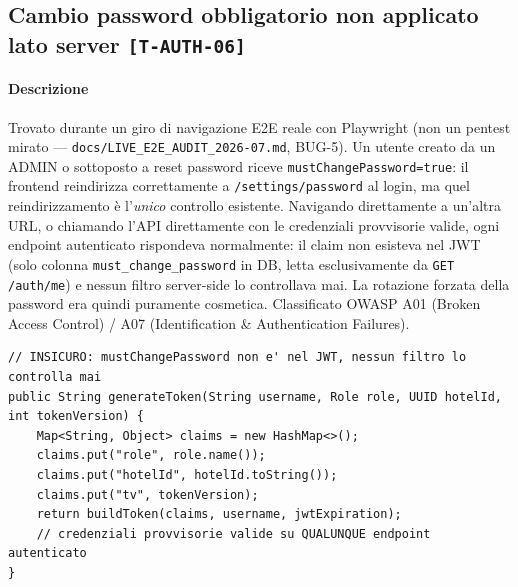 ﻿\documentclass[a4paper,12pt]{report}
\newcommand{\threat}[1]{\texttt{\small\textcolor{vulnred}{[#1]}}}
\begin{document}
\subsection{Cambio password obbligatorio non applicato lato server \threat{T-AUTH-06}}

\paragraph{Descrizione}
Trovato durante un giro di navigazione E2E reale con Playwright (non un pentest
mirato --- \texttt{docs/LIVE\_E2E\_AUDIT\_2026-07.md}, BUG-5). Un utente creato da
un ADMIN o sottoposto a reset password riceve \texttt{mustChangePassword=true}:
il frontend reindirizza correttamente a \texttt{/settings/password} al login, ma
quel reindirizzamento è l'\emph{unico} controllo esistente. Navigando direttamente
a un'altra URL, o chiamando l'API direttamente con le credenziali provvisorie
valide, ogni endpoint autenticato rispondeva normalmente: il claim non esisteva
nel JWT (solo colonna \texttt{must\_change\_password} in DB, letta esclusivamente
da \texttt{GET /auth/me}) e nessun filtro server-side lo controllava mai. La
rotazione forzata della password era quindi puramente cosmetica.
Classificato OWASP A01 (Broken Access Control) / A07 (Identification \&
Authentication Failures).

\begin{insecurebox}[title={Codice Vulnerabile --- enforcement assente (baseline)}]
\begin{lstlisting}[style=java]
// INSICURO: mustChangePassword non e' nel JWT, nessun filtro lo controlla mai
public String generateToken(String username, Role role, UUID hotelId, int tokenVersion) {
    Map<String, Object> claims = new HashMap<>();
    claims.put("role", role.name());
    claims.put("hotelId", hotelId.toString());
    claims.put("tv", tokenVersion);
    return buildToken(claims, username, jwtExpiration);
    // credenziali provvisorie valide su QUALUNQUE endpoint autenticato
}
\end{lstlisting}
\end{insecurebox}
\end{document}
